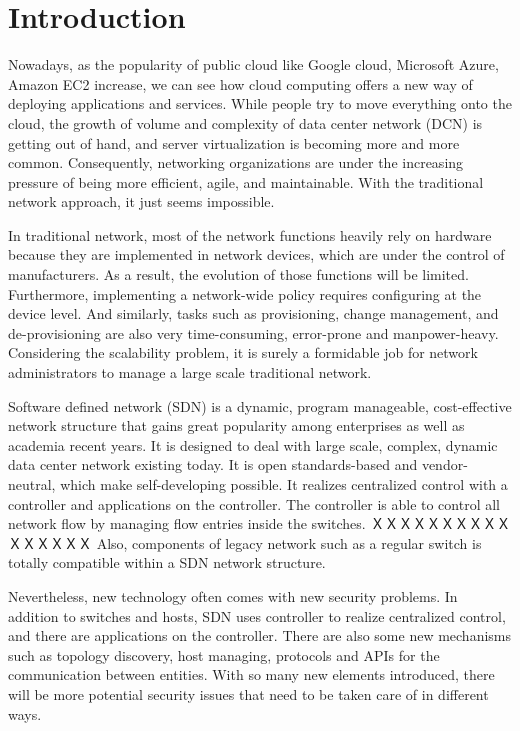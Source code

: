 \chapter{Introduction}
\label{chap:intro}
\setcounter{page}{1}

Nowadays, as the popularity of public cloud like Google cloud, Microsoft Azure, Amazon EC2 increase, we can see how cloud computing offers a new way of deploying applications and services. While people try to move everything onto the cloud, the growth of volume and complexity of data center network (DCN) is getting out of hand, and server virtualization is becoming more and more common. Consequently, networking organizations are under the increasing pressure of being more efficient, agile, and maintainable. With the traditional network approach, it just seems impossible.

In traditional network, most of the network functions heavily rely on hardware because they are implemented in network devices, which are under the control of manufacturers. As a result, the evolution of those functions will be limited. Furthermore, implementing a network-wide policy requires configuring at the device level. And similarly, tasks such as provisioning, change management, and de-provisioning are also very time-consuming, error-prone and manpower-heavy. Considering the scalability problem, it is surely a formidable job for network administrators to manage a large scale traditional network.

Software defined network (SDN) is a dynamic, program manageable, cost-effective network structure that gains great popularity among enterprises as well as academia recent years. It is designed to deal with large scale, complex, dynamic data center network existing today. It is open standards-based and vendor-neutral, which make self-developing possible. It realizes centralized control with a controller and applications on the controller. The controller is able to control all network flow by managing flow entries inside the switches. ＸＸＸＸＸＸＸＸＸＸＸＸＸＸＸＸ
Also, components of legacy network such as a regular switch is totally compatible within a SDN network structure.

Nevertheless, new technology often comes with new security problems. In addition to switches and hosts, SDN uses controller to realize centralized control, and there are applications on the controller. There are also some new mechanisms such as topology discovery, host managing, protocols and APIs for the communication between entities. With so many new elements introduced, there will be more potential security issues that need to be taken care of in different ways.

